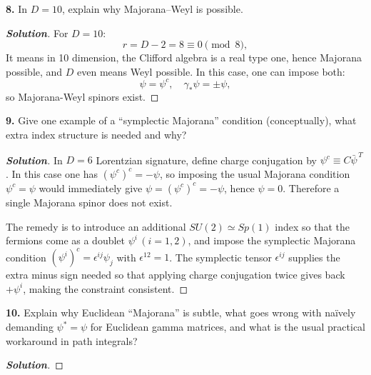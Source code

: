 \documentclass[11pt]{article}
\newenvironment{solution}[1][]{\begin{proof}[\textbf{Solution}]}{\end{proof}}
\begin{document}
\begin{tcolorbox}[problem]
\textbf{8.} In $D=10$, explain why Majorana--Weyl is possible.
\end{tcolorbox}
\begin{solution}[13.8]
	For $D=10:$
	$$r=D-2=8\equiv0\pmod8,$$
	It means in 10 dimension, the Clifford algebra is a real type one, hence Majorana possible, and $D$ even means Weyl possible. In
	this case, one can impose both:
	$$\psi=\psi^c,\quad\gamma_*\psi=\pm\psi,$$
	so Majorana-Weyl spinors exist.
\end{solution}

\begin{tcolorbox}[problem]
\textbf{9.} Give one example of a ``symplectic Majorana'' condition (conceptually), what extra index structure is needed and why?
\end{tcolorbox}
\begin{solution}[13.9]
	In \(D=6\) Lorentzian signature,
	define charge conjugation by \(\psi^c \equiv C\bar\psi^{\,T}\).
	In this case one has \((\psi^c)^c=-\psi\), so imposing the usual Majorana condition \(\psi^c=\psi\) would immediately give
	\(\psi=(\psi^c)^c=-\psi\), hence \(\psi=0\).
	Therefore a single Majorana spinor does not exist.
	
	The remedy is to introduce an additional \(SU(2)\simeq Sp(1)\) index so that the fermions come as a doublet
	\(\psi^i\,(i=1,2)\), and impose the symplectic Majorana condition
	\((\psi^i)^c=\epsilon^{ij}\psi_j\) with \(\epsilon^{12}=1\).
	The symplectic tensor \(\epsilon^{ij}\) supplies the extra minus sign needed so that applying charge conjugation twice gives back
	\(+\psi^i\), making the constraint consistent.
	
\end{solution}
\begin{tcolorbox}[problem]
\textbf{10.} Explain why Euclidean ``Majorana'' is subtle, what goes wrong with na\"ively demanding $\psi^\ast=\psi$ for Euclidean gamma matrices, and what is the usual practical workaround in path integrals?
\end{tcolorbox}
\begin{solution}
	
\end{solution}
\end{document}
